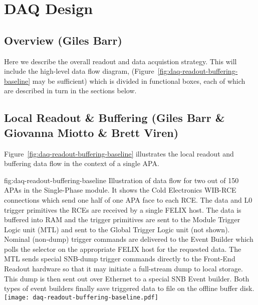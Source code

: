 
\section{DAQ Design}
\label{sec:fdsp-daq-design}



\subsection{Overview (Giles Barr)}
\label{sec:fdsp-daq-ltr}

Here we describe the overall readout and data acquistion
strategy. This will include the high-level data flow diagram,
(Figure~\ref{fig:daq-readout-buffering-baseline} may be sufficient)
which is divided in functional boxes, each of which are described in
turn in the sections below.

\subsection{Local Readout \& Buffering (Giles Barr \& Giovanna Miotto \& Brett Viren)}
\label{sec:fdsp-daq-ltr}


Figure~\ref{fig:daq-readout-buffering-baseline} illustrates the local
readout and buffering data flow in the context of a single APA.  

\begin{dunefigure}{fig:daq-readout-buffering-baseline}
  {Illustration of data flow for two out of 150 APAs in the
    Single-Phase module. 
    It shows the Cold Electronics WIB-RCE connections which send one
    half of one APA face to each RCE. 
    The data and L0 trigger primitives the RCEs are received by a
    single FELIX host. 
    The data is buffered into RAM and the trigger primitives are sent
    to the Module Trigger Logic unit (MTL) and sent to the Global
    Trigger Logic unit (not shown). 
    Nominal (non-dump) trigger commands are delivered to the Event
    Builder which polls the selector on the appropriate FELIX host for
    the requested data.
    The MTL sends special SNB-dump trigger commands directly to the
    Front-End Readout hardware so that it may initiate a full-stream
    dump to local storage. 
    This dump is then sent out over Ethernet to a special SNB Event
    builder. 
    Both types of event builders finally save triggered data to file
    on the offline buffer disk.}
\texttt{[image: daq-readout-buffering-baseline.pdf]}%
\end{dunefigure}


